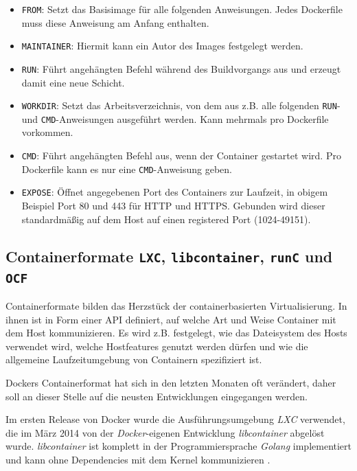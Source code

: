\documentclass[../main.tex]{subfiles}
\begin{document}
			\begin{itemize}
				\item \texttt{FROM}: Setzt das Basisimage für alle folgenden Anweisungen. Jedes Dockerfile muss diese Anweisung am Anfang enthalten.
				\item \texttt{MAINTAINER}: Hiermit kann ein Autor des Images festgelegt werden.
				\item \texttt{RUN}: Führt angehängten Befehl während des \gls{Build}vorgangs aus und erzeugt damit eine neue Schicht.
				\item \texttt{WORKDIR}: Setzt das Arbeitsverzeichnis, von dem aus z.B. alle folgenden \texttt{RUN}- und \texttt{CMD}-Anweisungen ausgeführt werden. Kann mehrmals pro Dockerfile vorkommen.
				\item \texttt{CMD}: Führt angehängten Befehl aus, wenn der Container gestartet wird. Pro Dockerfile kann es nur eine \texttt{CMD}-Anweisung geben.
				\item \texttt{EXPOSE}: Öffnet angegebenen Port des Containers zur Laufzeit, in obigem Beispiel Port 80 und 443 für \acrshort{HTTP} und \acrshort{HTTPS}. Gebunden wird dieser standardmäßig auf dem Host auf einen \glqq{}registered\grqq{} Port (1024-49151).
			\end{itemize}

		\subsection{Containerformate \texttt{LXC}, \texttt{libcontainer}, \texttt{runC} und \texttt{OCF}}
		\label{dockerContainerformate}
			Containerformate bilden das Herzstück der containerbasierten Virtualisierung. In ihnen ist in Form einer \acrshort{API} definiert, auf welche Art und Weise Container mit dem Host kommunizieren. Es wird z.B. festgelegt, wie das Dateisystem des Hosts verwendet wird, welche Hostfeatures genutzt werden dürfen und wie die allgemeine Laufzeitumgebung von Containern spezifiziert ist.

			Dockers Containerformat hat sich in den letzten Monaten oft verändert, daher soll an dieser Stelle auf die neusten Entwicklungen eingegangen werden.

			Im ersten Release von Docker wurde die Ausführungsumgebung \emph{LXC} verwendet, die im März 2014 von der \emph{Docker}-eigenen Entwicklung \emph{libcontainer} abgelöst wurde. \emph{libcontainer} ist komplett in der Programmiersprache \emph{Golang} implementiert und kann ohne Dependencies mit dem Kernel kommunizieren \cite{dockerLibcontainer}.
\end{document}
